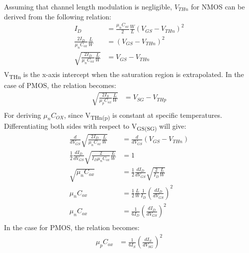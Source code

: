 \documentclass{article}
\begin{document}
\begin{enumerate}
Assuming that channel length modulation is negligible, \(V_{THn}\) for NMOS can be derived
from the following relation:
\begin{equation*}
\begin{aligned}
I_{D} &= \frac{\mu_{n}C_{ox}}{2} \frac{W}{L} (V_{GS} - V_{THn})^2 \\
\frac{2 I_{D}}{\mu_{n}C_{ox}}\frac{L}{W} &=  (V_{GS} - V_{THn})^2 \\
\sqrt{\frac{2 I_{D}}{\mu_{n}C_{ox}}\frac{L}{W}} &=  V_{GS} - V_{THn} \\
\end{aligned}
\end{equation*}
V\textsubscript{THn} is the x-axis intercept when the saturation region is extrapolated.
In the case of PMOS, the relation becomes:
\begin{equation*}
\begin{aligned}
\sqrt{\frac{2 I_{S}}{\mu_{p}C_{ox}}\frac{L}{W}} &=  V_{SG} - V_{THp} \\
\end{aligned}
\end{equation*}
For deriving \(\mu_{n}C_{OX}\), since V\textsubscript{THn(p)} is constant at specific temperatures.
Differentiating both sides with respect to V\textsubscript{GS(SG)} will give:
\begin{equation*}
\begin{aligned}
\frac{d}{dV_{GS}}\sqrt{\frac{2 I_{D}}{\mu_{n}C_{ox}}\frac{L}{W}} &=  \frac{d}{dV_{GS}}(V_{GS} - V_{THn}) \\
\frac{1}{2} \frac{dI_{D}}{dV_{GS}} \sqrt{\frac{2}{I_{D}\mu_{n}C_{ox}}\frac{L}{W}} &=  1 \\
\sqrt{\mu_{n}C_{ox}} &= \frac{1}{2} \frac{dI_{D}}{dV_{GS}} \sqrt{\frac{2}{I_{D}}\frac{L}{W}} \\
\mu_{n}C_{ox} &= \frac{1}{2} \frac{L}{W} \frac{1}{I_{D}}(\frac{dI_{D}}{dV_{GS}})^{2} \\
\mu_{n}C_{ox} &= \frac{1}{6 I_{D}}(\frac{dI_{D}}{dV_{GS}})^{2} \\
\end{aligned}
\end{equation*}
In the case for PMOS, the relation becomes:
\begin{equation*}
\begin{aligned}
\mu_{p}C_{ox} &= \frac{1}{6 I_{S}}(\frac{dI_{S}}{dV_{SG}})^{2} \\
\end{aligned}
\end{equation*}


\end{enumerate}
\end{document}
